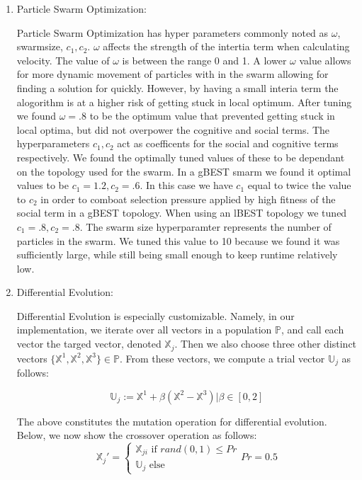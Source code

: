 \documentclass[twoside,11pt]{article}
\begin{document}
\begin{enumerate}
\item Particle Swarm Optimization:

	Particle Swarm Optimization has hyper parameters commonly noted as $\omega$, swarmsize, $c_1, c_2$. $\omega$ 
		affects the strength of the intertia term when calculating velocity. 
		The value of $\omega$ is between the range 0 and 1. A lower $\omega$ value allows for more dynamic 
		movement of particles with in the swarm allowing for finding a solution for quickly. 
		However, by having a small interia term the alogorithm is at a higher risk of getting stuck in local optimum. 
		After tuning we found $\omega = .8$ to be the optimum value that prevented getting stuck in local optima, but 
		did not overpower the cognitive and social terms. The hyperparameters $c_1, c_2$ act as coefficents for the social 
		and cognitive terms respectively. We found the optimally tuned values of these to be dependant on the topology used 
		for the swarm. In a gBEST smarm we found it optimal values to be $c_1 = 1.2, c_2 = .6$. In this case we have $c_1$ 
		equal to twice the value to $c_2$ in order to comboat selection pressure applied by high fitness of the social term in a gBEST 
		topology. When using an lBEST topology we tuned $c_1 = .8, c_2 = .8$. The swarm size hyperparamter represents the number of particles in the swarm. 
		We tuned this value to 10 because we found it was sufficiently large, while still being small enough to keep runtime relatively low.
  
\item Differential Evolution:

	Differential Evolution is especially customizable. Namely, in our implementation, we iterate over all vectors in a population $\mathbb{P}$, and call each vector
		the targed vector, denoted $\mathbb{X}_j$. Then we also choose three other distinct vectors $\{\mathbb{X}^1, \mathbb{X}^2, \mathbb{X}^3\}\in \mathbb{P}$.
		From these vectors, we compute a trial vector $\mathbb{U}_j$ as follows:

		\begin{equation}
			\mathbb{U}_j := \mathbb{X}^1 + \beta(\mathbb{X}^2 - \mathbb{X}^3) | \beta \in [0,2]
		\end{equation}

		The above constitutes the mutation operation for differential evolution. Below, we now show the crossover operation as follows:
		\begin{equation}
		\mathbb{X}_j'=
		\begin{cases}
			\mathbb{X}_{ji} \text{ if } rand(0,1)\leq Pr \\
			\mathbb{U}_j \text{ else}
		\end{cases}
		Pr = 0.5
		\end{equation}


\end{enumerate}
\end{document}
